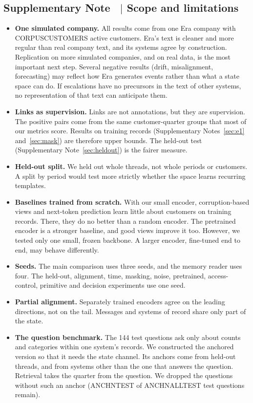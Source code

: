 \documentclass[11pt]{article}
\newcounter{suppnote}
\newcommand{\suppnote}[2]{\refstepcounter{suppnote}\label{#2}\subsection{Supplementary Note \thesuppnote\ $|$ #1}}
\begin{document}
\suppnote{Scope and limitations}{sec:limits}
\begin{itemize}
\item \textbf{One simulated company.} All results come from one Era company with CORPUSCUSTOMERS active customers. Era's text is cleaner and more regular than real company text, and its systems agree by construction. Replication on more simulated companies, and on real data, is the most important next step. Several negative results (drift, misalignment, forecasting) may reflect how Era generates events rather than what a state space can do. If escalations have no precursors in the text of other systems, no representation of that text can anticipate them.
\item \textbf{Links as supervision.} Links are not annotations, but they are supervision. The positive pairs come from the same customer-quarter groups that most of our metrics score. Results on training records (Supplementary Notes~\ref{sec:e1} and~\ref{sec:mask}) are therefore upper bounds. The held-out test (Supplementary Note~\ref{sec:heldout}) is the fairer measure.
\item \textbf{Held-out split.} We held out whole threads, not whole periods or customers. A split by period would test more strictly whether the space learns recurring templates.
\item \textbf{Baselines trained from scratch.} With our small encoder, corruption-based views and next-token prediction learn little about customers on training records. There, they do no better than a random encoder. The pretrained encoder is a stronger baseline, and good views improve it too. However, we tested only one small, frozen backbone. A larger encoder, fine-tuned end to end, may behave differently.
\item \textbf{Seeds.} The main comparison uses three seeds, and the memory reader uses four. The held-out, alignment, time, masking, noise, pretrained, access-control, primitive and decision experiments use one seed.
\item \textbf{Partial alignment.} Separately trained encoders agree on the leading directions, not on the tail. Messages and systems of record share only part of the state.
\item \textbf{The question benchmark.} The 144 test questions ask only about counts and categories within one system's records. We constructed the anchored version so that it needs the state channel. Its anchors come from held-out threads, and from systems other than the one that answers the question. Retrieval takes the quarter from the question. We dropped the questions without such an anchor (ANCHNTEST of ANCHNALLTEST test questions remain).


\end{itemize}
\end{document}
